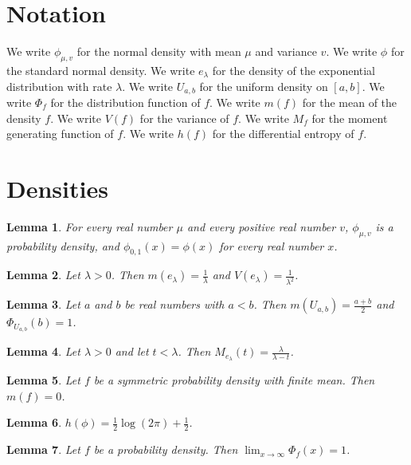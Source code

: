 \documentclass{article}
\newtheorem{lemma}{Lemma}
\begin{document}
\section{Notation}

We write $\phi_{\mu,v}$ for the normal density with mean $\mu$ and variance $v$.
We write $\phi$ for the standard normal density.
We write $e_\lambda$ for the density of the exponential distribution with rate $\lambda$.
We write $U_{a,b}$ for the uniform density on $[a,b]$.
We write $\Phi_f$ for the distribution function of $f$.
We write $m(f)$ for the mean of the density $f$.
We write $V(f)$ for the variance of $f$.
We write $M_f$ for the moment generating function of $f$.
We write $h(f)$ for the differential entropy of $f$.

\section{Densities}

\begin{lemma}\label{normal}
For every real number $\mu$ and every positive real number $v$, $\phi_{\mu,v}$ is a probability density, and $\phi_{0,1}(x)=\phi(x)$ for every real number $x$.
\end{lemma}

\begin{lemma}\label{exponential}
Let $\lambda>0$. Then $m(e_\lambda)=\frac{1}{\lambda}$ and $V(e_\lambda)=\frac{1}{\lambda^2}$.
\end{lemma}

\begin{lemma}\label{uniform}
Let $a$ and $b$ be real numbers with $a<b$. Then $m(U_{a,b})=\frac{a+b}{2}$ and $\Phi_{U_{a,b}}(b)=1$.
\end{lemma}

\begin{lemma}\label{mgf}
Let $\lambda>0$ and let $t<\lambda$. Then $M_{e_\lambda}(t)=\frac{\lambda}{\lambda-t}$.
\end{lemma}

\begin{lemma}\label{symmetric}
Let $f$ be a symmetric probability density with finite mean. Then $m(f)=0$.
\end{lemma}

\begin{lemma}\label{entropy}
$h(\phi)=\frac{1}{2}\log(2\pi)+\frac{1}{2}$.
\end{lemma}

\begin{lemma}\label{cdf}
Let $f$ be a probability density. Then $\lim_{x\to\infty}\Phi_f(x)=1$.
\end{lemma}
\end{document}
